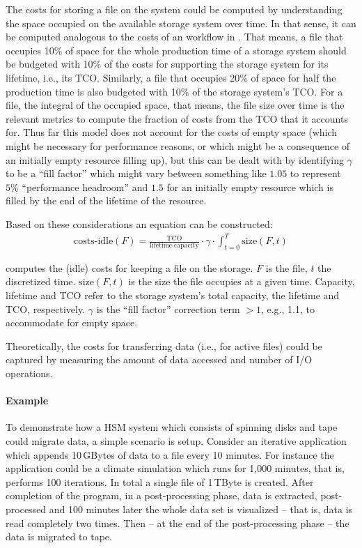 \documentclass{../../template/esiwace-report}
\begin{document}
The costs for storing a file on the system could be computed by understanding the space occupied on the available storage system over time.
In that sense, it can be computed analogous to the costs of an workflow in .
That means, a file that occupies 10\% of space for the whole production time of a storage system should be budgeted with 10\% of the costs for supporting the storage system for its lifetime, i.e., its TCO.
Similarly, a file that occupies 20\% of space for half the production time is also budgeted with 10\% of the storage system's TCO.
For a file, the integral of the occupied space, that means, the file size over time is the relevant metrics to compute the fraction of costs from the TCO that it accounts for.
Thus far this model does not account for the costs of empty space (which might be necessary for performance reasons, or which might be a consequence of an initially empty resource filling up), but this can be dealt with by identifying $\gamma$  to be a ``fill factor'' which might vary between something like $1.05$ to represent $5\%$ ``performance headroom'' and $1.5$ for an initially empty resource which is filled by the end of the lifetime of the resource.

Based on these considerations an equation can be constructed:
\begin{align}
\label{eq:idlefiles}
\mbox{costs-idle}(F) = \frac{\mbox{TCO}}{\mbox{lifetime} \cdot \mbox{capacity}}  \cdot \gamma \cdot \int_{t = 0}^{T} {\mbox{size}(F,t)}
\end{align}

 computes the (idle) costs for keeping a file on the storage.
$F$ is the file, $t$ the discretized time.
$\mbox{size}(F,t)$ is the size the file occupies at a given time.
Capacity, lifetime and TCO refer to the storage system's total capacity, the lifetime and TCO, respectively.
$\gamma$ is the ``fill factor'' correction term $> 1$, e.g., 1.1, to accommodate for empty space.

Theoretically, the costs for transferring data (i.e., for active files) could be captured by measuring the amount of data accessed and number of I/O operations.

\paragraph{Example}
To demonstrate how a HSM system which consists of spinning disks and tape could migrate data, a simple scenario is setup.
Consider an iterative application which appends 10\,G\-Bytes of data to a file every 10 minutes.
For instance the application could be a climate simulation which runs for 1,000 minutes, that is, performs 100 iterations.
In total a single file of 1\,TByte is created.
After completion of the program, in a post-processing phase, data is extracted, post-processed and 100 minutes later the whole data set is visualized -- that is, data is read completely two times.
Then -- at the end of the post-processing phase -- the data is migrated to tape.
\end{document}
